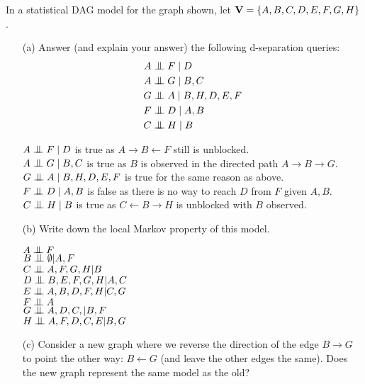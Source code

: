 \documentclass[11pt]{article}
\newcommand{\ci}{\mathrel{\text{\scalebox{1.07}{$\perp\mkern-10mu\perp$}}}}
\begin{document}
In a statistical DAG model for the graph shown, let ${\bf V} = \{ A, B, C, D, E, F, G, H \}$.
\begin{itemize}
\item[(a)] Answer (and explain your answer) the following d-separation queries:
\begin{align*}
A &\ci F \mid D \\
A &\ci G \mid B,C \\
G &\ci A \mid  B,H,D,E,F \\
F &\ci D \mid A,B \\
C &\ci H \mid B 
\end{align*}
\begin{answertext}{3cm}{}

$A \ci F \mid D$ is true as $A \rightarrow B \leftarrow F$ still is unblocked.\\
$A \ci G \mid B,C$ is true as $B$ is observed in the directed path $A \rightarrow B \rightarrow G$.\\
$G \ci A \mid B,H,D,E,F$ is true for the same reason as above.\\
$F \ci D \mid A,B$ is false as there is no way to reach $D$ from $F$ given $A, B$.\\
$C \ci H \mid B$ is true as $C \leftarrow B \rightarrow H$ is unblocked with $B$ observed.

\end{answertext} 

\item[(b)] Write down the local Markov property of this model.

\begin{answertext}{4.5cm}{}    

$A \ci F$\\
$B \ci \emptyset | A, F$\\
$C \ci A, F, G, H | B$\\
$D \ci B,E,F,G,H | A,C$\\
$E \ci A,B,D,F,H | C,G$\\
$F \ci A$\\
$G \ci A,D,C, | B,F$\\
$H \ci A,F,D,C,E | B,G$\\

\end{answertext}

\item[(c)] Consider a new graph where we reverse the direction of the edge $B \to G$ to point the other way: $B \gets G$ (and leave the other edges the same).  Does the new graph represent the same model as the old?


\end{itemize}
\end{document}
